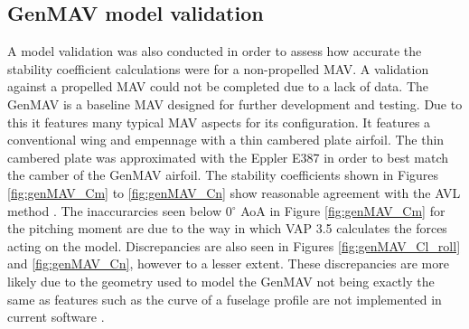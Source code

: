 \subsection{\acrshort{GenMAV} model validation}
A model validation was also conducted in order to assess how accurate the stability coefficient calculations were for a non-propelled \acrshort{MAV}. A validation against a propelled \acrshort{MAV} could not be completed due to a lack of data. The GenMAV is a baseline \acrshort{MAV} designed for further development and testing. Due to this it features many typical \acrshort{MAV} aspects for its configuration. It features a conventional wing and empennage with a thin cambered plate airfoil. The thin cambered plate was approximated with the Eppler E387 in order to best match the camber of the GenMAV airfoil. The stability coefficients shown in Figures \ref{fig:genMAV_Cm} to \ref{fig:genMAV_Cn} show reasonable agreement with the \acrshort{AVL} method \cite{Stewart2007}. The inaccurarcies seen below 0$^\circ$ \acrshort{AoA} in Figure \ref{fig:genMAV_Cm} for the pitching moment are due to the way in which VAP 3.5 calculates the forces acting on the model. Discrepancies are also seen in Figures \ref{fig:genMAV_Cl_roll} and \ref{fig:genMAV_Cn}, however to a lesser extent. These discrepancies are more likely due to the geometry used to model the GenMAV not being exactly the same as features such as the curve of a fuselage profile are not implemented in current software \cite{Stewart2007}.


